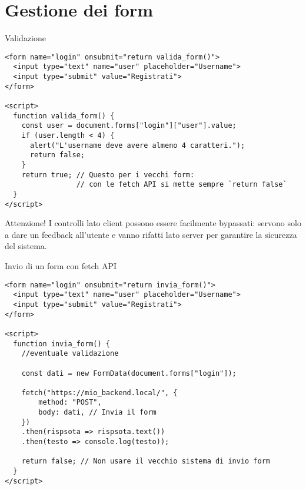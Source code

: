 \section[Form]{Gestione dei form}

\begin{frame}[fragile]{Validazione}\transfade\centering
  \begin{verbatim}
<form name="login" onsubmit="return valida_form()">
  <input type="text" name="user" placeholder="Username">
  <input type="submit" value="Registrati">
</form>

<script>
  function valida_form() {
    const user = document.forms["login"]["user"].value;
    if (user.length < 4) {
      alert("L'username deve avere almeno 4 caratteri.");
      return false;
    }
    return true; // Questo per i vecchi form:
                 // con le fetch API si mette sempre `return false`
  }
</script>
  \end{verbatim}
  \pause\par
  \alert{Attenzione!} I controlli lato client possono essere facilmente bypassati: servono solo a dare un feedback all'utente e vanno rifatti lato server per garantire la sicurezza del sistema.\\
\end{frame}

\begin{frame}[fragile]{Invio di un form con fetch API}\transfade\centering
  \begin{verbatim}
<form name="login" onsubmit="return invia_form()">
  <input type="text" name="user" placeholder="Username">
  <input type="submit" value="Registrati">
</form>

<script>
  function invia_form() {
    //eventuale validazione

    const dati = new FormData(document.forms["login"]);

    fetch("https://mio_backend.local/", {
        method: "POST",
        body: dati, // Invia il form
    })
    .then(rispsota => rispsota.text())
    .then(testo => console.log(testo));

    return false; // Non usare il vecchio sistema di invio form
  }
</script>
  \end{verbatim}
\end{frame}

